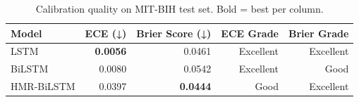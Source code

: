 \begin{table}[h!]
\centering
\caption{Calibration quality on MIT-BIH test set. Bold = best per column.}
\label{tab:calibration}
\begin{tabular}{lrrrr}
\toprule
Model & ECE (↓) & Brier Score (↓) & ECE Grade & Brier Grade \\
\midrule
LSTM & \textbf{0.0056} & 0.0461 & Excellent & Excellent \\
BiLSTM & 0.0080 & 0.0542 & Excellent & Good \\
HMR-BiLSTM & 0.0397 & \textbf{0.0444} & Good & Excellent \\
\bottomrule
\end{tabular}
\end{table}
